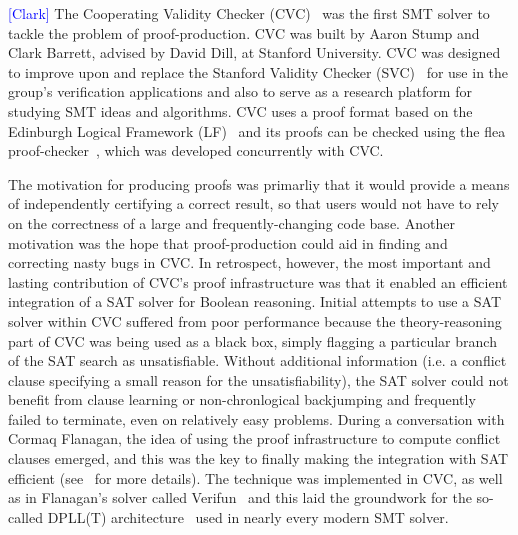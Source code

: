 \documentclass{llncs}
\newcommand{\Note}[1]{\textcolor{blue}{[#1]}}
\begin{document}
\Note{Clark}
The Cooperating Validity Checker (CVC)~\cite{SBD02} was the first SMT solver to
tackle the problem of proof-production.  CVC was built by Aaron Stump and Clark
Barrett, advised by David Dill, at Stanford University.  CVC was designed to
improve upon and replace the Stanford Validity Checker (SVC)~\cite{BDL96} for
use in the group's verification applications and also to serve as a research
platform for studying SMT ideas and algorithms.    CVC
uses a proof format based on the Edinburgh Logical Framework (LF)~\cite{HHP93}
and its proofs can be checked using the flea proof-checker~\cite{SBD02b,SD02}, which was
developed concurrently with CVC.

The motivation for producing proofs was primarliy that it would provide a means
of independently certifying a correct result,
so that users would not have to rely on the correctness of a large and
frequently-changing code base.  Another motivation was the hope that
proof-production could aid in finding and correcting nasty bugs in CVC.
In retrospect, however, the most important and lasting contribution of CVC's
proof infrastructure was that it enabled an efficient integration of a SAT
solver for Boolean reasoning.  Initial attempts to use a SAT solver within
CVC suffered from poor performance because the theory-reasoning part of CVC
was being used as a black box, simply flagging a particular branch of the SAT
search as unsatisfiable.  Without additional information (i.e. a conflict
clause specifying a small reason for the unsatisfiability), the SAT solver could
not benefit from clause learning or non-chronlogical backjumping and frequently
failed to terminate, even on relatively easy problems.  During a conversation
with Cormaq Flanagan, the idea of using the proof infrastructure to compute
conflict clauses emerged, and this was the key to finally making the
integration with SAT efficient (see~\cite{BDS02-CAV02} for more details).  The
technique was implemented in CVC, as well as in Flanagan's solver called
Verifun~\cite{FJO+03} and this laid the groundwork for the so-called DPLL(T)
architecture~\cite{NieOT-JACM-06} used in nearly every modern SMT solver.
\end{document}

